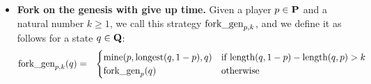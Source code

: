 \begin{itemize}

\item {\bf Fork on the genesis with give up time.} Given a player $p \in \mathbf{P}$ and a natural number $k \geq 1$, we call this strategy $\text{\rm fork\_gen}_{p,k}$, and we define it as follows for a state $q \in \mathbf{Q}$:
\begin{eqnarray*}
\text{\rm fork\_gen}_{p,k}(q) & = &
\begin{cases}
\text{\rm mine}(p,{\text{\rm longest}}(q,1-p),q) & \text{if } \text{\rm length}(q,1-p) - \text{\rm length}(q,p) > k\\
\text{\rm fork\_gen}_p(q) &   \text{otherwise}
\end{cases}
\end{eqnarray*}


\end{itemize}




